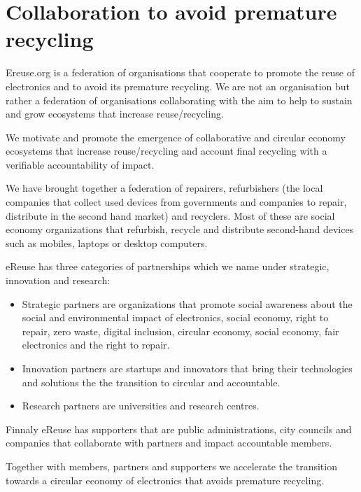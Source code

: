 \documentclass[
]{book}
\begin{document}
\hypertarget{collaboration-to-avoid-premature-recycling}{%
\section{Collaboration to avoid premature recycling}\label{collaboration-to-avoid-premature-recycling}}

Ereuse.org is a federation of organisations that cooperate to promote the reuse of electronics and to avoid its premature recycling. We are not an organisation but rather a federation of organisations collaborating with the aim to help to sustain and grow ecosystems that increase reuse/recycling.

We motivate and promote the emergence of collaborative and circular economy ecosystems that increase reuse/recycling and account final recycling with a verifiable accountability of impact.

We have brought together a federation of repairers, refurbishers (the local companies that collect used devices from governments and companies to repair, distribute in the second hand market) and recyclers. Most of these are social economy organizations that refurbish, recycle and distribute second-hand devices such as mobiles, laptops or desktop computers.

eReuse has three categories of partnerships which we name under strategic, innovation and research:

\begin{itemize}
\item
  Strategic partners are organizations that promote social awareness about the social and environmental impact of electronics, social economy, right to repair, zero waste, digital inclusion, circular economy, social economy, fair electronics and the right to repair.
\item
  Innovation partners are startups and innovators that bring their technologies and solutions the the transition to circular and accountable.
\item
  Research partners are universities and research centres.
\end{itemize}

Finnaly eReuse has supporters that are public administrations, city councils and companies that collaborate with partners and impact accountable members.

Together with members, partners and supporters we accelerate the transition towards a circular economy of electronics that avoids premature recycling.
\end{document}
